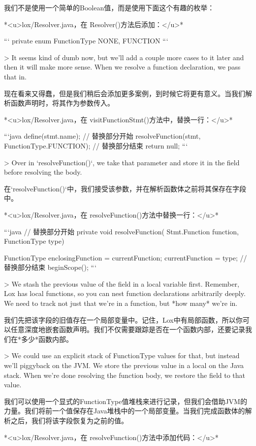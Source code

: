 \documentclass[cn,11pt,chinese]{elegantbook}
\begin{document}
{{{{{{{{{{{{{{{{我们不是使用一个简单的Boolean值，而是使用下面这个有趣的枚举：

*<u>lox/Resolver.java，在 Resolver()方法后添加：</u>*

```
  private enum FunctionType {
    NONE,
    FUNCTION
  }
```

> It seems kind of dumb now, but we’ll add a couple more cases to it later and then it will make more sense. When we resolve a function declaration, we pass that in.

现在看来又得蠢，但是我们稍后会添加更多案例，到时候它将更有意义。当我们解析函数声明时，将其作为参数传入。

*<u>lox/Resolver.java，在 visitFunctionStmt()方法中，替换一行：</u>*

```java
    define(stmt.name);
    // 替换部分开始
    resolveFunction(stmt, FunctionType.FUNCTION);
    // 替换部分结束
    return null;
```

> Over in `resolveFunction()`, we take that parameter and store it in the field before resolving the body.

在`resolveFunction()`中，我们接受该参数，并在解析函数体之前将其保存在字段中。

*<u>lox/Resolver.java，在 resolveFunction()方法中替换一行：</u>*

```java
  // 替换部分开始
	private void resolveFunction(
      Stmt.Function function, FunctionType type) {
    FunctionType enclosingFunction = currentFunction;
    currentFunction = type;
    // 替换部分结束
    beginScope();
```

> We stash the previous value of the field in a local variable first. Remember, Lox has local functions, so you can nest function declarations arbitrarily deeply. We need to track not just that we’re in a function, but *how many* we’re in.

我们先把该字段的旧值存在一个局部变量中。记住，Lox中有局部函数，所以你可以任意深度地嵌套函数声明。我们不仅需要跟踪是否在一个函数内部，还要记录我们在*多少*函数内部。

> We could use an explicit stack of FunctionType values for that, but instead we’ll piggyback on the JVM. We store the previous value in a local on the Java stack. When we’re done resolving the function body, we restore the field to that value.

我们可以使用一个显式的FunctionType值堆栈来进行记录，但我们会借助JVM的力量。我们将前一个值保存在Java堆栈中的一个局部变量。当我们完成函数体的解析之后，我们将该字段恢复为之前的值。

*<u>lox/Resolver.java，在 resolveFunction()方法中添加代码：</u>*

}}}}}}}}}}}}}}}}}
\end{document}
